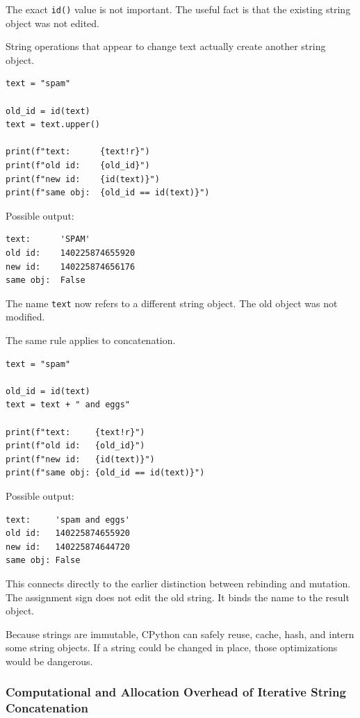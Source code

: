 The exact \texttt{id()} value is not important. The useful fact is that the existing string object was not edited.

String operations that appear to change text actually create another string object.

\begin{verbatim}
text = "spam"

old_id = id(text)
text = text.upper()

print(f"text:      {text!r}")
print(f"old id:    {old_id}")
print(f"new id:    {id(text)}")
print(f"same obj:  {old_id == id(text)}")
\end{verbatim}

Possible output:

\begin{verbatim}
text:      'SPAM'
old id:    140225874655920
new id:    140225874656176
same obj:  False
\end{verbatim}

The name \texttt{text} now refers to a different string object. The old object was not modified.

The same rule applies to concatenation.

\begin{verbatim}
text = "spam"

old_id = id(text)
text = text + " and eggs"

print(f"text:     {text!r}")
print(f"old id:   {old_id}")
print(f"new id:   {id(text)}")
print(f"same obj: {old_id == id(text)}")
\end{verbatim}

Possible output:

\begin{verbatim}
text:     'spam and eggs'
old id:   140225874655920
new id:   140225874644720
same obj: False
\end{verbatim}

This connects directly to the earlier distinction between rebinding and mutation. The assignment sign does not edit the old string. It binds the name to the result object.

Because strings are immutable, CPython can safely reuse, cache, hash, and intern some string objects. If a string could be changed in place, those optimizations would be dangerous.

\subsubsection{Computational and Allocation Overhead of Iterative String Concatenation}

